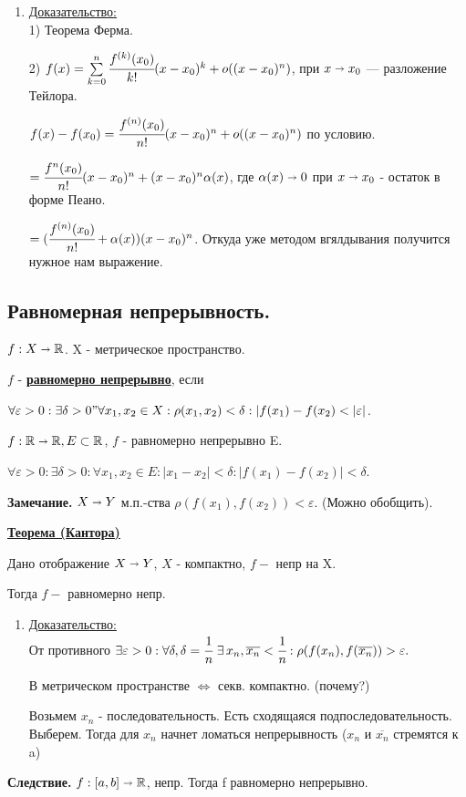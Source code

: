 \documentclass{article}
\newcommand{\deff}[1]{\underline{\textbf{#1}}}
\newcommand{\thmm}[1]{\underline{\textbf{#1}}}
\newcommand{\prooff}[1]{{\underline{Доказательство:}} \\ }
\begin{document}
\begin{enumerate}
    \item[] \prooff{}
    1) Теорема Ферма.

    2) $f(x) = \sum\limits_{k=0}^n \cfrac{f^{(k)}(x_0)}{k!}(x-x_0)^k + o((x-x_0)^n)$, при $x\shortrightarrow x_0$ --- разложение Тейлора.

    $f(x) -f(x_0)= \cfrac{f^{(n)}(x_0)}{n!}(x-x_0)^n + o((x-x_0)^n)$ по условию.

    $=\cfrac{f^{n}(x_0)}{n!}(x-x_0)^n + (x-x_0)^n \alpha(x)$, где $\alpha(x) \shortrightarrow 0 $  при $x\shortrightarrow x_0$ - остаток в форме Пеано.

    $= (\cfrac{f^{(n)}(x_0)}{n!} + \alpha(x))(x-x_0)^n$. Откуда уже методом вгялдывания получится нужное нам выражение.
\end{enumerate}

\pagebreak
\subsection{Равномерная непрерывность.}

$f: X \shortrightarrow \mathbb{R}$. X - метрическое пространство. 

$f$ - \deff{равномерно непрерывно}, если

$\forall \varepsilon > 0: \exists \delta >0" \forall x_1,x_2 \in X: \rho(x_1,x_2)<\delta: |f(x_1)-f(x_2)<|\varepsilon|$.

$f: \mathbb{R}\shortrightarrow \mathbb{R}, E\subset \mathbb{R}$, $f$ - равномерно непрерывно E.

$\forall \varepsilon >0: \exists \delta>0: \forall x_1,x_2 \in E: |x_1-x_2|<\delta: |f(x_1)-f(x_2)|< \delta$.

\textbf{Замечание.} $X \shortrightarrow Y$ м.п.-ства $\rho(f(x_1),f(x_2))<\varepsilon$. (Можно обобщить).

\thmm{Теорема (Кантора)}

Дано отображение $X \shortrightarrow Y$, $X$ - компактно, $f -$ непр на X.

Тогда $f -$ равномерно непр.

\begin{enumerate}
    \item[] \prooff{}
    От противного
   $\exists \varepsilon > 0: \forall \delta, \delta = \cfrac{1}{n}\,\, \exists \,x_n, \overline{x_n}<\cfrac{1}{n}: \rho(f(x_n),f(\overline{x_n}))>\varepsilon.$

   В метрическом пространстве $\Leftrightarrow$ секв. компактно. (почему?)

   Возьмем $x_n$ - последовательность. Есть сходящаяся подпоследовательность. Выберем. Тогда для $x_n$ начнет ломаться непрерывность ($x_n $ и $\overline{x_n}$ стремятся к a)
\end{enumerate}

\textbf{Следствие.} $f:[a,b] \shortrightarrow \mathbb{R}$, непр. Тогда f равномерно непрерывно.
\end{document}
